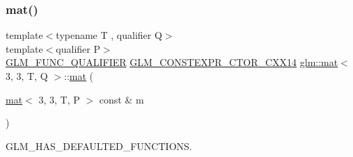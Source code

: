 \mbox{\label{structglm_1_1mat_3_013_00_013_00_01_t_00_01_q_01_4_a58f5f32696916511bd3c65a06ddded18}} 
\subsubsection{\texorpdfstring{mat()}{mat()}\hspace{0.1cm}{\footnotesize\ttfamily [18/21]}}
{\footnotesize\ttfamily template$<$typename T , qualifier Q$>$ \\
template$<$qualifier P$>$ \\
\hyperlink{setup_8hpp_a33fdea6f91c5f834105f7415e2a64407}{G\+L\+M\+\_\+\+F\+U\+N\+C\+\_\+\+Q\+U\+A\+L\+I\+F\+I\+ER} \hyperlink{setup_8hpp_a0900f9145e68bf6061b6f5e7be3fa751}{G\+L\+M\+\_\+\+C\+O\+N\+S\+T\+E\+X\+P\+R\+\_\+\+C\+T\+O\+R\+\_\+\+C\+X\+X14} \hyperlink{structglm_1_1mat}{glm\+::mat}$<$ 3, 3, T, Q $>$\+::\hyperlink{structglm_1_1mat}{mat} (\begin{DoxyParamCaption}\item[{\hyperlink{structglm_1_1mat}{mat}$<$ 3, 3, T, P $>$ const \&}]{m }\end{DoxyParamCaption})}



G\+L\+M\+\_\+\+H\+A\+S\+\_\+\+D\+E\+F\+A\+U\+L\+T\+E\+D\+\_\+\+F\+U\+N\+C\+T\+I\+O\+NS. 

\mbox{\label{structglm_1_1mat_3_013_00_013_00_01_t_00_01_q_01_4_a16e5dfdbeabd922f89d0b7ac9a6a07cc}} 
